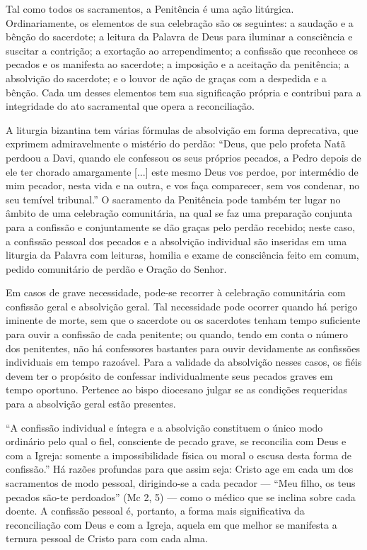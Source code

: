 Tal como todos os sacramentos, a Penitência é uma ação litúrgica. Ordinariamente, os elementos de sua celebração são os seguintes: a saudação e a bênção do sacerdote; a leitura da Palavra de Deus para iluminar a consciência e suscitar a contrição; a exortação ao arrependimento; a confissão que reconhece os pecados e os manifesta ao sacerdote; a imposição e a aceitação da penitência; a absolvição do sacerdote; e o louvor de ação de graças com a despedida e a bênção. Cada um desses elementos tem sua significação própria e contribui para a integridade do ato sacramental que opera a reconciliação.

A liturgia bizantina tem várias fórmulas de absolvição em forma deprecativa, que exprimem admiravelmente o mistério do perdão: ``Deus, que pelo profeta Natã perdoou a Davi, quando ele confessou os seus próprios pecados, a Pedro depois de ele ter chorado amargamente [...] este mesmo Deus vos perdoe, por intermédio de mim pecador, nesta vida e na outra, e vos faça comparecer, sem vos condenar, no seu temível tribunal.'' O sacramento da Penitência pode também ter lugar no âmbito de uma celebração comunitária, na qual se faz uma preparação conjunta para a confissão e conjuntamente se dão graças pelo perdão recebido; neste caso, a confissão pessoal dos pecados e a absolvição individual são inseridas em uma liturgia da Palavra com leituras, homilia e exame de consciência feito em comum, pedido comunitário de perdão e Oração do Senhor.

Em casos de grave necessidade, pode-se recorrer à celebração comunitária com confissão geral e absolvição geral. Tal necessidade pode ocorrer quando há perigo iminente de morte, sem que o sacerdote ou os sacerdotes tenham tempo suficiente para ouvir a confissão de cada penitente; ou quando, tendo em conta o número dos penitentes, não há confessores bastantes para ouvir devidamente as confissões individuais em tempo razoável. Para a validade da absolvição nesses casos, os fiéis devem ter o propósito de confessar individualmente seus pecados graves em tempo oportuno. Pertence ao bispo diocesano julgar se as condições requeridas para a absolvição geral estão presentes.

``A confissão individual e íntegra e a absolvição constituem o único modo ordinário pelo qual o fiel, consciente de pecado grave, se reconcilia com Deus e com a Igreja: somente a impossibilidade física ou moral o escusa desta forma de confissão.'' Há razões profundas para que assim seja: Cristo age em cada um dos sacramentos de modo pessoal, dirigindo-se a cada pecador --- ``Meu filho, os teus pecados são-te perdoados'' (Mc 2, 5) --- como o médico que se inclina sobre cada doente. A confissão pessoal é, portanto, a forma mais significativa da reconciliação com Deus e com a Igreja, aquela em que melhor se manifesta a ternura pessoal de Cristo para com cada alma.

